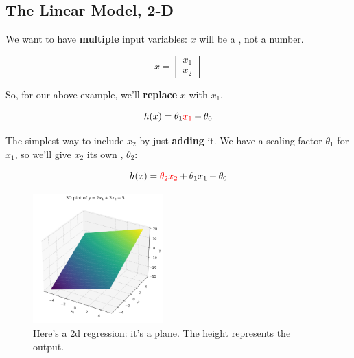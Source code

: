     \phantom{}
        
    \subsection{The Linear Model, 2-D}
    
        We want to have \textbf{multiple} input variables: $x$ will be a , not a number. 

        \begin{equation}
            x = \begin{bmatrix}
                x_1 \\ x_2
            \end{bmatrix}
        \end{equation}
        
        So, for our above example, we'll \textbf{replace} $x$ with $x_1$.
        
        \begin{equation}
            h(x) = \theta_1 \textcolor{red}{x_1} + \theta_0
        \end{equation}
        
        The simplest way to include $x_2$ by just \textbf{adding} it. We have a scaling factor $\theta_1$ for $x_1$, so we'll give $x_2$ its own , $\theta_2$:
        
        \begin{equation}
            h(x) = \textcolor{red}{\theta_2 x_2} + \theta_1 x_1 + \theta_0
        \end{equation}

        \begin{figure}[H]
            \centering
            \includegraphics[width=50mm,scale=0.5]{images/regression_images/plane.png}
        
            \caption*{Here's a 2d regression: it's a plane. The height represents the output.}
        \end{figure}
        
